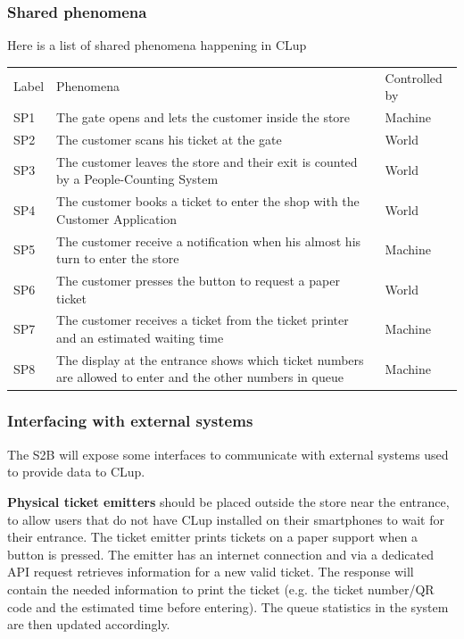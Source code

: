 \subsubsection{Shared phenomena}
Here is a list of shared phenomena happening in CLup

\renewcommand{\arraystretch}{1.4}
\begin{tabular}{C{1cm}L{10.5cm}C{2.6cm}}
    Label & Phenomena                                                                                                  & Controlled by \\
    SP1   & The gate opens and lets the customer inside the store                                                      & Machine       \\
    SP2   & The customer scans his ticket at the gate                                                                  & World         \\
    SP3   & The customer leaves the store and their exit is counted by a People-Counting System                        & World         \\
    SP4   & The customer books a ticket to enter the shop with the Customer Application                                & World         \\
    SP5   & The customer receive a notification when his almost his turn to enter the store                            & Machine       \\
    SP6   & The customer presses the button to request a paper ticket                                                  & World         \\
    SP7   & The customer receives a ticket from the ticket printer and an estimated waiting time                       & Machine       \\
    SP8   & The display at the entrance shows which ticket numbers are allowed to enter and the other numbers in queue & Machine       \\
\end{tabular}

\subsubsection{Interfacing with external systems}
The S2B will expose some interfaces to communicate with external systems used to provide data to CLup.


\textbf{Physical ticket emitters} should be placed outside the store near the entrance, to allow users that do not have CLup installed on their smartphones to wait for their entrance. The ticket emitter prints tickets on a paper support when a button is pressed. The emitter has an internet connection and via a dedicated API request retrieves information for a new valid ticket. The response will contain the needed information to print the ticket (e.g. the ticket number/QR code and the estimated time before entering). The queue statistics in the system are then updated accordingly.

